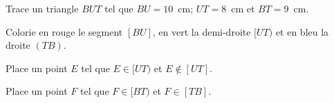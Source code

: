 \begin{myenumerate}
\item Trace un triangle $BUT$ tel que $BU=10$~cm; $UT=8$~cm et
$BT=9$~cm.
\item Colorie en rouge le segment $[BU]$, en vert la demi-droite
$[UT)$ et en bleu la droite $(TB)$.
\item Place un point $E$ tel que $E\in[UT)$ et $E\not\in[UT]$.
\item Place un point $F$ tel que $F\in[BT)$ et $F\in[TB]$.
\end{myenumerate}